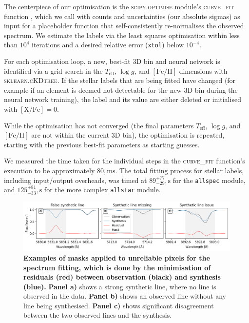 \documentclass[
  journal=pasa,
  manuscript=research-paper, %
  year=2024,
  volume=37
]{cup-journal}
\newcommand{\Teff}{$T_\mathrm{eff}$\xspace}
\newcommand{\logg}{$\log g$\xspace}
\newcommand{\feh}{$\mathrm{[Fe/H]}$\xspace}
\newcommand{\TLF}{\Teff, \logg, and \feh}
\begin{document}
The centerpiece of our optimisation is the \textsc{scipy.optimise} module's \textsc{curve\_fit} function \citep{scipy}, which we call with counts and uncertainties (our absolute sigmas) as input for a placeholder function that self-consistently re-normalises the observed spectrum. We estimate the labels via the least squares optimisation within less than $10^4$ iterations and a desired relative error (\texttt{xtol}) below $10^{-4}$.

For each optimisation loop, a new, best-fit 3D bin and neural network is identified via a grid search in the \TLF dimensions with \textsc{sklearn.cKDtree}. If the stellar labels that are being fitted have changed (for example if an element is deemed not detectable for the new 3D bin during the neural network training), the label and its value are either deleted or initialised with $\mathrm{[X/Fe]} = 0$.

While the optimisation has not converged (the final parameters \TLF are not within the current 3D bin), the optimisation is repeated, starting with the previous best-fit parameters as starting guesses.

We measured the time taken for the individual steps in the \textsc{curve\_fit} function's execution to be approximately $80,\mathrm{ms}$. The total fitting process for stellar labels, including input/output overheads, was timed at $89_{-29}^{+77},\mathrm{s}$ for the \texttt{allspec} module, and $125_{-33}^{+81},\mathrm{s}$ for the more complex \texttt{allstar} module.

\begin{figure}[ht]
\centering  
\includegraphics[width=\textwidth]{figures/example_masking_sun.png}
\caption{\textbf{Examples of masks applied to unreliable pixels for the spectrum fitting, which is done by the minimisation of residuals (red) between observation (black) and synthesis (blue).} \textbf{Panel a)} shows a strong synthetic line, where no line is observed in the data. \textbf{Panel b)} shows an observed line without any line being synthesised. \textbf{Panel c)} shows significant disagreement between the two observed lines and the synthesis.} \label{fig:example_masking_sun}
\end{figure}
\end{document}

